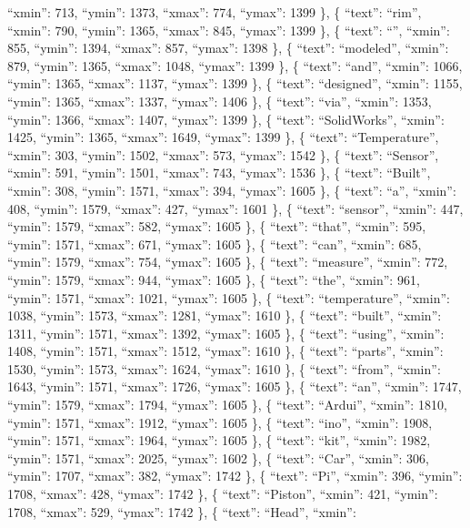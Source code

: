 \documentclass[
]{article}
\begin{document}
``xmin'': 713, ``ymin'': 1373, ``xmax'': 774, ``ymax'': 1399 \}, \{
``text'': ``rim'', ``xmin'': 790, ``ymin'': 1365, ``xmax'': 845,
``ymax'': 1399 \}, \{ ``text'': ``\textbar{}'', ``xmin'': 855, ``ymin'':
1394, ``xmax'': 857, ``ymax'': 1398 \}, \{ ``text'': ``modeled'',
``xmin'': 879, ``ymin'': 1365, ``xmax'': 1048, ``ymax'': 1399 \}, \{
``text'': ``and'', ``xmin'': 1066, ``ymin'': 1365, ``xmax'': 1137,
``ymax'': 1399 \}, \{ ``text'': ``designed'', ``xmin'': 1155, ``ymin'':
1365, ``xmax'': 1337, ``ymax'': 1406 \}, \{ ``text'': ``via'', ``xmin'':
1353, ``ymin'': 1366, ``xmax'': 1407, ``ymax'': 1399 \}, \{ ``text'':
``SolidWorks'', ``xmin'': 1425, ``ymin'': 1365, ``xmax'': 1649,
``ymax'': 1399 \}, \{ ``text'': ``Temperature'', ``xmin'': 303,
``ymin'': 1502, ``xmax'': 573, ``ymax'': 1542 \}, \{ ``text'':
``Sensor'', ``xmin'': 591, ``ymin'': 1501, ``xmax'': 743, ``ymax'': 1536
\}, \{ ``text'': ``Built'', ``xmin'': 308, ``ymin'': 1571, ``xmax'':
394, ``ymax'': 1605 \}, \{ ``text'': ``a'', ``xmin'': 408, ``ymin'':
1579, ``xmax'': 427, ``ymax'': 1601 \}, \{ ``text'': ``sensor'',
``xmin'': 447, ``ymin'': 1579, ``xmax'': 582, ``ymax'': 1605 \}, \{
``text'': ``that'', ``xmin'': 595, ``ymin'': 1571, ``xmax'': 671,
``ymax'': 1605 \}, \{ ``text'': ``can'', ``xmin'': 685, ``ymin'': 1579,
``xmax'': 754, ``ymax'': 1605 \}, \{ ``text'': ``measure'', ``xmin'':
772, ``ymin'': 1579, ``xmax'': 944, ``ymax'': 1605 \}, \{ ``text'':
``the'', ``xmin'': 961, ``ymin'': 1571, ``xmax'': 1021, ``ymax'': 1605
\}, \{ ``text'': ``temperature'', ``xmin'': 1038, ``ymin'': 1573,
``xmax'': 1281, ``ymax'': 1610 \}, \{ ``text'': ``built'', ``xmin'':
1311, ``ymin'': 1571, ``xmax'': 1392, ``ymax'': 1605 \}, \{ ``text'':
``using'', ``xmin'': 1408, ``ymin'': 1571, ``xmax'': 1512, ``ymax'':
1610 \}, \{ ``text'': ``parts'', ``xmin'': 1530, ``ymin'': 1573,
``xmax'': 1624, ``ymax'': 1610 \}, \{ ``text'': ``from'', ``xmin'':
1643, ``ymin'': 1571, ``xmax'': 1726, ``ymax'': 1605 \}, \{ ``text'':
``an'', ``xmin'': 1747, ``ymin'': 1579, ``xmax'': 1794, ``ymax'': 1605
\}, \{ ``text'': ``Ardui'', ``xmin'': 1810, ``ymin'': 1571, ``xmax'':
1912, ``ymax'': 1605 \}, \{ ``text'': ``ino'', ``xmin'': 1908, ``ymin'':
1571, ``xmax'': 1964, ``ymax'': 1605 \}, \{ ``text'': ``kit'', ``xmin'':
1982, ``ymin'': 1571, ``xmax'': 2025, ``ymax'': 1602 \}, \{ ``text'':
``Car'', ``xmin'': 306, ``ymin'': 1707, ``xmax'': 382, ``ymax'': 1742
\}, \{ ``text'': ``Pi'', ``xmin'': 396, ``ymin'': 1708, ``xmax'': 428,
``ymax'': 1742 \}, \{ ``text'': ``Piston'', ``xmin'': 421, ``ymin'':
1708, ``xmax'': 529, ``ymax'': 1742 \}, \{ ``text'': ``Head'', ``xmin'':
\end{document}
